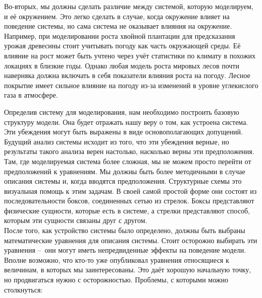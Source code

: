Во-вторых, мы должны сделать различие между системой, которую моделируем, и её окружением. Это легко сделать в случае, когда окружение влияет на поведение системы, но сама система не оказывает влияния на окружение. Например, при моделировании роста хвойной плантации для предсказания урожая древесины стоит учитывать погоду как часть окружающей среды. Её влияние на рост может быть учтено через учёт статистики по климату в похожих локациях в близкие годы. Однако любая модель роста мировых лесов почти наверняка должна включать в себя показатели влияния роста на погоду. Лесное покрытие имеет сильное влияние на погоду из-за изменений в уровне углекислого газа в атмосфере. \\


Определив систему для моделирования, нам необходимо построить базовую структуру модели. Она будет отражать нашу веру о том, как устроена система. Эти убеждения могут быть выражены в виде основополагающих допущений. Будущий анализ системы исходит из того, что эти убеждения верные, но результаты такого анализа верен настолько, насколько верны эти предположения. \\

Там, где моделируемая система более сложная, мы не можем просто перейти от предположений к уравнениям. Мы должны быть более методичными в случае описания системы и, когда вводятся предположения. Структурные схемы это визуальная помощь к этим задачам. В своей самой простой форме они состоят из последовательности боксов, соединенных сетью из стрелок. Боксы представляют физические сущности, которые есть в системе, а стрелки представляют способ, которым эти сущности связаны друг с другом. \\

После того, как устройство системы было определено, должны быть выбраны математические уравнения для описания системы. Стоит осторожно выбирать эти уравнения – они могут иметь непредвиденные эффекты на поведение модели. \\

Вполне возможно, что кто-то уже опубликовал уравнения относящиеся к величинам, в которых мы заинтересованы. Это даёт хорошую начальную точку, но продвигаться нужно с осторожностью. Проблемы, с которыми можно столкнуться: \\

